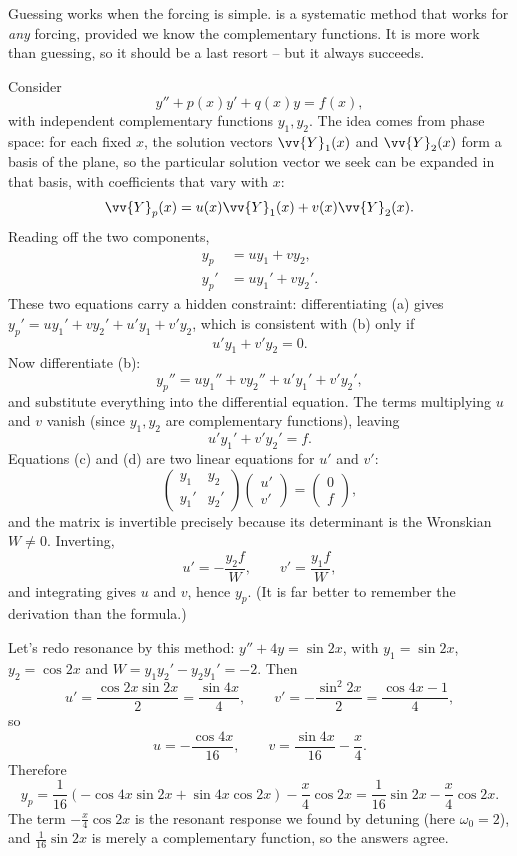 Guessing works when the forcing is simple.  is a systematic method that works for \emph{any} forcing, provided we know the complementary functions. It is more work than guessing, so it should be a last resort -- but it always succeeds.

Consider
$$
y'' + p(x) y' + q(x) y = f(x),
$$
with independent complementary functions $y_1, y_2$. The idea comes from phase space: for each fixed $x$, the solution vectors $\vv{Y}_1(x)$ and $\vv{Y}_2(x)$ form a basis of the plane, so the particular solution vector we seek can be expanded in that basis, with coefficients that vary with $x$:
$$
\vv{Y}_p(x) = u(x) \vv{Y}_1(x) + v(x) \vv{Y}_2(x).
$$
Reading off the two components,
\begin{align}
	y_p &= u y_1 + v y_2, \tag{a} \\
	y_p' &= u y_1' + v y_2'. \tag{b}
\end{align}
These two equations carry a hidden constraint: differentiating (a) gives $y_p' = uy_1' + vy_2' + u'y_1 + v'y_2$, which is consistent with (b) only if
\begin{equation}
u' y_1 + v' y_2 = 0. \tag{c}
\end{equation}
Now differentiate (b):
$$
y_p'' = u y_1'' + v y_2'' + u' y_1' + v' y_2',
$$
and substitute everything into the differential equation. The terms multiplying $u$ and $v$ vanish (since $y_1, y_2$ are complementary functions), leaving
\begin{equation}
u' y_1' + v' y_2' = f. \tag{d}
\end{equation}
Equations (c) and (d) are two linear equations for $u'$ and $v'$:
$$
\begin{pmatrix} y_1 & y_2 \\ y_1' & y_2' \end{pmatrix}
\begin{pmatrix} u' \\ v' \end{pmatrix} = \begin{pmatrix} 0 \\ f \end{pmatrix},
$$
and the matrix is invertible precisely because its determinant is the Wronskian $W \neq 0$. Inverting,
$$
u' = -\frac{y_2 f}{W}, \qquad v' = \frac{y_1 f}{W},
$$
and integrating gives $u$ and $v$, hence $y_p$. (It is far better to remember the derivation than the formula.)

\begin{example}
	Let's redo resonance by this method: $y'' + 4y = \sin 2x$, with $y_1 = \sin 2x$, $y_2 = \cos 2x$ and $W = y_1y_2' - y_2 y_1' = -2$. Then
	$$
	u' = \frac{\cos 2x \sin 2x}{2} = \frac{\sin 4x}{4}, \qquad v' = -\frac{\sin^2 2x}{2} = \frac{\cos 4x - 1}{4},
	$$
	so
	$$
	u = -\frac{\cos 4x}{16}, \qquad v = \frac{\sin 4x}{16} - \frac{x}{4}.
	$$
	Therefore
	$$
	y_p = \frac{1}{16}\left(-\cos 4x \sin 2x + \sin 4x \cos 2x\right) - \frac{x}{4}\cos 2x = \frac{1}{16}\sin 2x - \frac{x}{4}\cos 2x.
	$$
	The term $-\frac{x}{4}\cos 2x$ is the resonant response we found by detuning (here $\omega_0 = 2$), and $\frac{1}{16}\sin 2x$ is merely a complementary function, so the answers agree.
\end{example}

